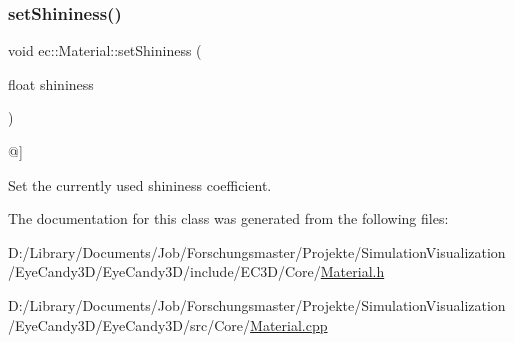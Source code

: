 \subsubsection{\texorpdfstring{set\+Shininess()}{setShininess()}}
{\footnotesize\ttfamily void ec\+::\+Material\+::set\+Shininess (\begin{DoxyParamCaption}\item[{float}]{shininess }\end{DoxyParamCaption})}



@\mbox{]} 

Set the currently used shininess coefficient. 

The documentation for this class was generated from the following files\+:\begin{DoxyCompactItemize}
\item 
D\+:/\+Library/\+Documents/\+Job/\+Forschungsmaster/\+Projekte/\+Simulation\+Visualization/\+Eye\+Candy3\+D/\+Eye\+Candy3\+D/include/\+E\+C3\+D/\+Core/\mbox{\hyperlink{_material_8h}{Material.\+h}}\item 
D\+:/\+Library/\+Documents/\+Job/\+Forschungsmaster/\+Projekte/\+Simulation\+Visualization/\+Eye\+Candy3\+D/\+Eye\+Candy3\+D/src/\+Core/\mbox{\hyperlink{_material_8cpp}{Material.\+cpp}}\end{DoxyCompactItemize}
